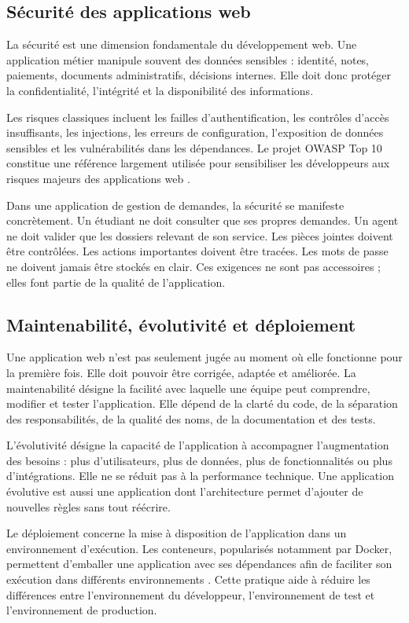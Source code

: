 \subsection{Sécurité des applications web}

La sécurité est une dimension fondamentale du développement web. Une application métier manipule souvent des données sensibles : identité, notes, paiements, documents administratifs, décisions internes. Elle doit donc protéger la confidentialité, l'intégrité et la disponibilité des informations.

Les risques classiques incluent les failles d'authentification, les contrôles d'accès insuffisants, les injections, les erreurs de configuration, l'exposition de données sensibles et les vulnérabilités dans les dépendances. Le projet OWASP Top 10 constitue une référence largement utilisée pour sensibiliser les développeurs aux risques majeurs des applications web \cite{owaspTopTen2026}.

Dans une application de gestion de demandes, la sécurité se manifeste concrètement. Un étudiant ne doit consulter que ses propres demandes. Un agent ne doit valider que les dossiers relevant de son service. Les pièces jointes doivent être contrôlées. Les actions importantes doivent être tracées. Les mots de passe ne doivent jamais être stockés en clair. Ces exigences ne sont pas accessoires ; elles font partie de la qualité de l'application.

\subsection{Maintenabilité, évolutivité et déploiement}

Une application web n'est pas seulement jugée au moment où elle fonctionne pour la première fois. Elle doit pouvoir être corrigée, adaptée et améliorée. La maintenabilité désigne la facilité avec laquelle une équipe peut comprendre, modifier et tester l'application. Elle dépend de la clarté du code, de la séparation des responsabilités, de la qualité des noms, de la documentation et des tests.

L'évolutivité désigne la capacité de l'application à accompagner l'augmentation des besoins : plus d'utilisateurs, plus de données, plus de fonctionnalités ou plus d'intégrations. Elle ne se réduit pas à la performance technique. Une application évolutive est aussi une application dont l'architecture permet d'ajouter de nouvelles règles sans tout réécrire.

Le déploiement concerne la mise à disposition de l'application dans un environnement d'exécution. Les conteneurs, popularisés notamment par Docker, permettent d'emballer une application avec ses dépendances afin de faciliter son exécution dans différents environnements \cite{merkel2014docker,7036275}. Cette pratique aide à réduire les différences entre l'environnement du développeur, l'environnement de test et l'environnement de production.

